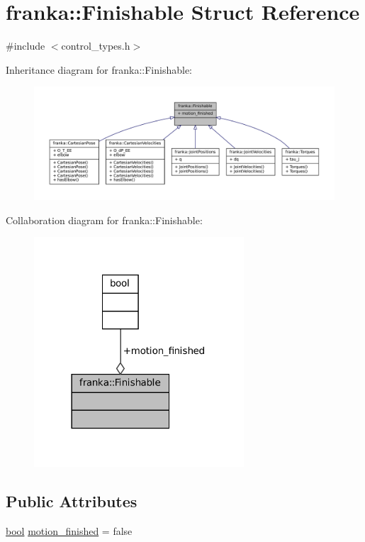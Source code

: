 \hypertarget{structfranka_1_1Finishable}{}\section{franka\+:\+:Finishable Struct Reference}
\label{structfranka_1_1Finishable}


{\ttfamily \#include $<$control\+\_\+types.\+h$>$}



Inheritance diagram for franka\+:\+:Finishable\+:
\nopagebreak
\begin{figure}[H]
\begin{center}
\leavevmode
\includegraphics[width=350pt]{structfranka_1_1Finishable__inherit__graph}
\end{center}
\end{figure}


Collaboration diagram for franka\+:\+:Finishable\+:
\nopagebreak
\begin{figure}[H]
\begin{center}
\leavevmode
\includegraphics[width=222pt]{structfranka_1_1Finishable__coll__graph}
\end{center}
\end{figure}
\subsection*{Public Attributes}
\begin{DoxyCompactItemize}
\item 
\hyperlink{classbool}{bool} \hyperlink{structfranka_1_1Finishable_a5d48028c0f912d4a089e6220d8715f7f}{motion\+\_\+finished} = false
\end{DoxyCompactItemize}


